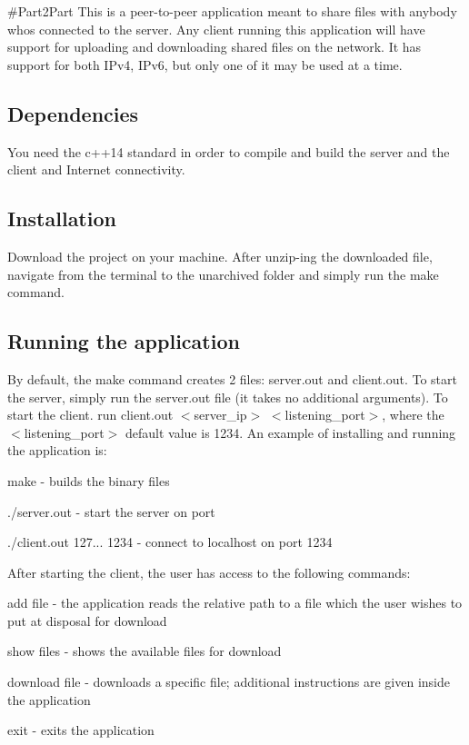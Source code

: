 \#\+Part2\+Part This is a peer-\/to-\/peer application meant to share files with anybody who\textquotesingle{}s connected to the server. Any client running this application will have support for uploading and downloading shared files on the network. It has support for both I\+Pv4, I\+Pv6, but only one of it may be used at a time. \subsection*{Dependencies}

You need the c++14 standard in order to compile and build the server and the client and Internet connectivity. \subsection*{Installation}

Download the project on your machine. After unzip-\/ing the downloaded file, navigate from the terminal to the unarchived folder and simply run the {\ttfamily make} command. \subsection*{Running the application}

By default, the {\ttfamily make} command creates 2 files\+: {\ttfamily server.\+out} and {\ttfamily client.\+out}. To start the server, simply run the {\ttfamily server.\+out} file (it takes no additional arguments). To start the client. run {\ttfamily client.\+out $<$server\+\_\+ip$>$ $<$listening\+\_\+port$>$}, where the {\ttfamily $<$listening\+\_\+port$>$} default value is 1234. An example of installing and running the application is\+:
\begin{DoxyItemize}
\item {\ttfamily make} -\/ builds the binary files
\item {\ttfamily ./server.out} -\/ start the server on port {}
\item {\ttfamily ./client.out 127... 1234} -\/ connect to localhost on port 1234
\end{DoxyItemize}

After starting the client, the user has access to the following commands\+:
\begin{DoxyItemize}
\item {\ttfamily add file} -\/ the application reads the relative path to a file which the user wishes to put at disposal for download
\item {\ttfamily show files} -\/ shows the available files for download
\item {\ttfamily download file} -\/ downloads a specific file; additional instructions are given inside the application
\item {\ttfamily exit} -\/ exits the application 
\end{DoxyItemize}